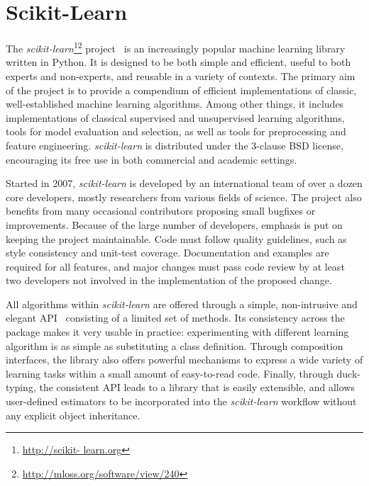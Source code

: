 \documentclass{article}
\newcommand{\sklearn}{\textit{scikit-learn}\xspace}
\begin{document}

\section*{Scikit-Learn}

The \sklearn\footnote{\url{http://scikit-
learn.org}}\footnote{\url{http://mloss.org/software/view/240}}
project~\citep{pedregosa2011} is an increasingly popular machine learning
library written in Python.  It is designed to be both  simple and efficient,
useful to both experts and non-experts, and reusable in a variety of contexts.
The  primary aim of the project is to provide a compendium of efficient
implementations of classic, well-established  machine learning algorithms.
Among other things, it includes implementations of classical supervised and
unsupervised learning algorithms, tools for model evaluation and selection, as
well as tools for preprocessing and feature engineering. \sklearn is
distributed under the 3-clause  BSD license, encouraging its free use in both
commercial and academic settings.

Started in 2007, \sklearn is developed by an international team of over a dozen
core developers, mostly researchers from various fields of science. The project
also benefits from many occasional contributors proposing small bugfixes or
improvements. Because of the large number of developers, emphasis is put on
keeping the project maintainable. Code must follow quality guidelines, such as
style consistency and unit-test coverage. Documentation and examples are
required for all features, and major changes must pass code review by at least
two developers not involved in the implementation of the proposed change.

All algorithms within \sklearn are offered through a simple, non-intrusive and
elegant API~\citep{buitinck2013api} consisting of a limited set of methods. Its
consistency across the package makes it very usable in practice:
experimenting with different learning algorithm is as simple as substituting a
class definition. Through composition interfaces, the library also offers
powerful mechanisms to express a wide variety of learning tasks within a small
amount of easy-to-read code. Finally, through duck-typing, the consistent API
leads to a library that is easily extensible, and allows user-defined
estimators to be incorporated into the \sklearn workflow without any explicit
object inheritance.
\end{document}
